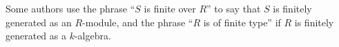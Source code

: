 Some authors use the phrase \enquote{$S$ is finite over $R$} to say that $S$
is finitely generated as an $R$-module, and the phrase \enquote {$R$ is of finite
type} if $R$ is finitely generated as a $k$-algebra.
